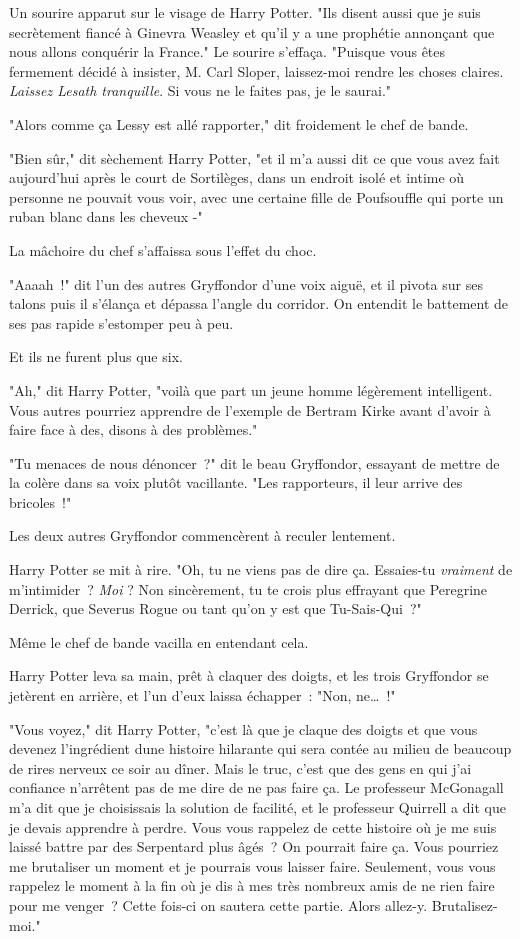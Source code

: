 Un sourire apparut sur le visage de Harry Potter. "Ils disent aussi que je suis secrètement fiancé à Ginevra Weasley et qu'il y a une prophétie annonçant que nous allons conquérir la France." Le sourire s'effaça. "Puisque vous êtes fermement décidé à insister, M. Carl Sloper, laissez-moi rendre les choses claires. \emph{Laissez Lesath tranquille}. Si vous ne le faites pas, je le saurai."

"Alors comme ça Lessy est allé rapporter," dit froidement le chef de bande.

"Bien sûr," dit sèchement Harry Potter, "et il m'a aussi dit ce que vous avez fait aujourd'hui après le court de Sortilèges, dans un endroit isolé et intime où personne ne pouvait vous voir, avec une certaine fille de Poufsouffle qui porte un ruban blanc dans les cheveux -"

La mâchoire du chef s'affaissa sous l'effet du choc.

"Aaaah~!" dit l'un des autres Gryffondor d'une voix aiguë, et il pivota sur ses talons puis il s'élança et dépassa l'angle du corridor. On entendit le battement de ses pas rapide s'estomper peu à peu.

Et ils ne furent plus que six.

"Ah," dit Harry Potter, "voilà que part un jeune homme légèrement intelligent. Vous autres pourriez apprendre de l'exemple de Bertram Kirke avant d'avoir à faire face à des, disons à des problèmes."

"Tu menaces de nous dénoncer~?" dit le beau Gryffondor, essayant de mettre de la colère dans sa voix plutôt vacillante. "Les rapporteurs, il leur arrive des bricoles~!"

Les deux autres Gryffondor commencèrent à reculer lentement.

Harry Potter se mit à rire. "Oh, tu ne viens pas de dire ça. Essaies-tu \emph{vraiment} de m'intimider~? \emph{Moi} ? Non sincèrement, tu te crois plus effrayant que Peregrine Derrick, que Severus Rogue ou tant qu'on y est que Tu-Sais-Qui~?"

Même le chef de bande vacilla en entendant cela.

Harry Potter leva sa main, prêt à claquer des doigts, et les trois Gryffondor se jetèrent en arrière, et l'un d'eux laissa échapper~: "Non, ne…~!"

"Vous voyez," dit Harry Potter, "c'est là que je claque des doigts et que vous devenez l'ingrédient dune histoire hilarante qui sera contée au milieu de beaucoup de rires nerveux ce soir au dîner. Mais le truc, c'est que des gens en qui j'ai confiance n'arrêtent pas de me dire de ne pas faire ça. Le professeur McGonagall m'a dit que je choisissais la solution de facilité, et le professeur Quirrell a dit que je devais apprendre à perdre. Vous vous rappelez de cette histoire où je me suis laissé battre par des Serpentard plus âgés~? On pourrait faire ça. Vous pourriez me brutaliser un moment et je pourrais vous laisser faire. Seulement, vous vous rappelez le moment à la fin où je dis à mes très nombreux amis de ne rien faire pour me venger~? Cette fois-ci on sautera cette partie. Alors allez-y. Brutalisez-moi."

